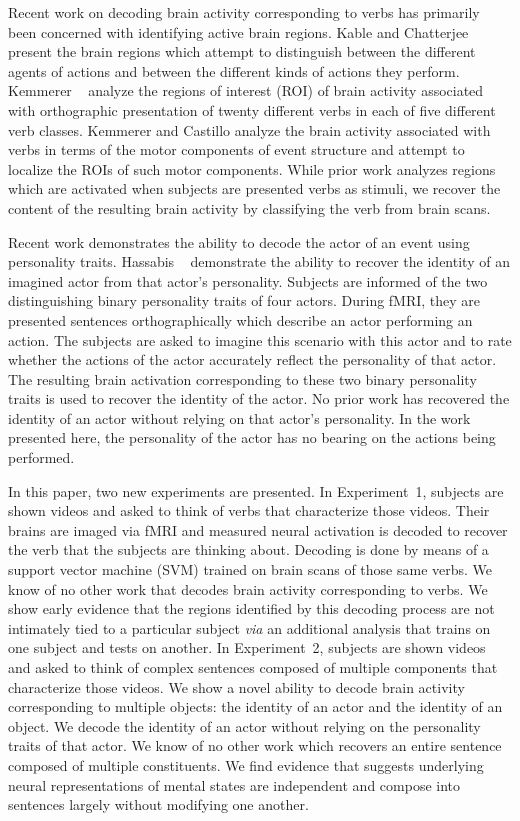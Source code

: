 Recent work on decoding brain activity corresponding to verbs has primarily
been concerned with identifying active brain regions.
%
Kable and Chatterjee \cite{kable2006} present the brain regions which attempt to distinguish
between the different agents of actions and between the different kinds of
actions they perform.
%
Kemmerer \etal\ \cite{kemmerer2008} analyze the regions of interest
(ROI) of brain activity associated with orthographic presentation of
twenty different verbs in each of five different verb classes.
%
Kemmerer and Castillo \cite{kemmerer2010} analyze the brain activity
associated with verbs in terms of the motor components of event
structure and attempt to localize the ROIs of such motor components.
%
While prior work analyzes regions which are activated when subjects are
presented verbs as stimuli, we recover the content of the resulting brain
activity by classifying the verb from brain scans.

Recent work demonstrates the ability to decode the actor of an event using
personality traits.
%
Hassabis \etal\ \cite{Hassabis-etal-2013a} demonstrate the ability to
recover the identity of an imagined actor from that actor's
personality.
%
Subjects are informed of the two distinguishing binary personality traits of
four actors.
%
During fMRI, they are presented sentences orthographically which describe an
actor performing an action.
%
The subjects are asked to imagine this scenario with this actor and to rate
whether the actions of the actor accurately reflect the personality of that
actor.
%
The resulting brain activation corresponding to these two binary personality
traits is used to recover the identity of the actor.
%
No prior work has recovered the identity of an actor without relying on that
actor's personality.
%
In the work presented here, the personality of the actor has no bearing on the
actions being performed.

In this paper, two new experiments are presented.
%
In Experiment~1, subjects are shown videos and asked to think of verbs that
characterize those videos.
%
Their brains are imaged via fMRI and measured neural activation is
decoded to recover the verb that the subjects are thinking about.
%
Decoding is done by means of a support vector machine (SVM) trained on brain
scans of those same verbs.
%
We know of no other work that decodes brain activity corresponding to verbs.
%
We show early evidence that the regions identified by this decoding process are
not intimately tied to a particular subject \emph{via} an additional analysis
that trains on one subject and tests on another.
%
In Experiment~2, subjects are shown videos and asked to think of complex
sentences composed of multiple components that characterize those videos.
%
We show a novel ability to decode brain activity corresponding to multiple
objects: the identity of an actor and the identity of an object.
%
We decode the identity of an actor without relying on the personality traits of
that actor.
%
We know of no other work which recovers an entire sentence composed of multiple
constituents.
%
We find evidence that suggests underlying neural representations of mental
states are independent and compose into sentences largely without modifying one
another.

